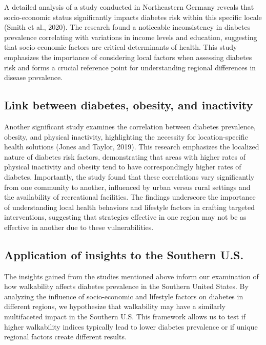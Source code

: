 \documentclass[
]{article}
\begin{document}
A detailed analysis of a study conducted in Northeastern Germany reveals
that socio-economic status significantly impacts diabetes risk within
this specific locale (Smith et al., 2020). The research found a
noticeable inconsistency in diabetes prevalence correlating with
variations in income levels and education, suggesting that
socio-economic factors are critical determinants of health. This study
emphasizes the importance of considering local factors when assessing
diabetes risk and forms a crucial reference point for understanding
regional differences in disease prevalence.

\subsection{Link between diabetes, obesity, and
inactivity}\label{link-between-diabetes-obesity-and-inactivity}

Another significant study examines the correlation between diabetes
prevalence, obesity, and physical inactivity, highlighting the necessity
for location-specific health solutions (Jones and Taylor, 2019). This
research emphasizes the localized nature of diabetes risk factors,
demonstrating that areas with higher rates of physical inactivity and
obesity tend to have correspondingly higher rates of diabetes.
Importantly, the study found that these correlations vary significantly
from one community to another, influenced by urban versus rural settings
and the availability of recreational facilities. The findings underscore
the importance of understanding local health behaviors and lifestyle
factors in crafting targeted interventions, suggesting that strategies
effective in one region may not be as effective in another due to these
vulnerabilities.

\subsection{Application of insights to the Southern
U.S.}\label{application-of-insights-to-the-southern-u.s.}

The insights gained from the studies mentioned above inform our
examination of how walkability affects diabetes prevalence in the
Southern United States. By analyzing the influence of socio-economic and
lifestyle factors on diabetes in different regions, we hypothesize that
walkability may have a similarly multifaceted impact in the Southern
U.S. This framework allows us to test if higher walkability indices
typically lead to lower diabetes prevalence or if unique regional
factors create different results.
\end{document}
